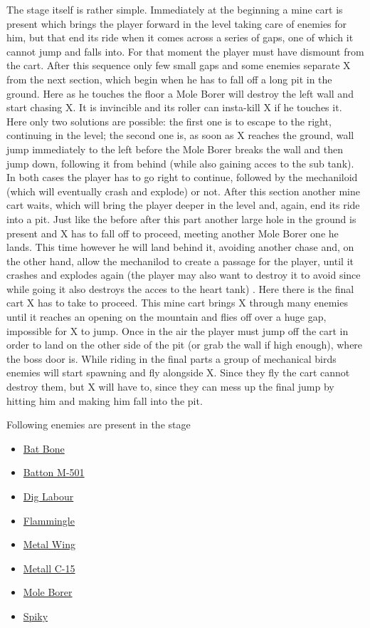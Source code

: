 The stage itself is rather simple. Immediately at the beginning a mine cart is present which brings the player forward in the level taking care of enemies for him, but that end its ride when it comes across a series of gaps, one of which it cannot jump and falls into. For that moment the player must have dismount from the cart. After this sequence only few small gaps and some enemies separate X from the next section, which begin when he has to fall off a long pit in the ground. Here as he touches the floor a Mole Borer will destroy the left wall and start chasing X. It is invincible and its roller can insta-kill X if he touches it. Here only two solutions are possible: the first one is to escape to the right, continuing in the level; the second one is, as soon as X reaches the ground, wall jump immediately to the left before the Mole Borer breaks the wall and then jump down, following it from behind (while also gaining acces to the sub tank). In both cases the player has to go right to continue, followed by the mechaniloid (which will eventually crash and explode) or not. After this section another mine cart waits, which will bring the player deeper in the level and, again, end its ride into a pit. Just like the before after this part another large hole in the ground is present and X has to fall off to proceed, meeting another Mole Borer one he lands. This time however he will land behind it, avoiding another chase and, on the other hand, allow the mechanilod to create a passage for the player, until it crashes and explodes again (the player may also want to destroy it to avoid since while going it also destroys the acces to the heart tank) . Here there is the final cart X has to take to proceed. This mine cart brings X through many enemies until it reaches an opening on the mountain and flies off over a huge gap, impossible for X to jump. Once in the air the player must jump off the cart in order to land on the other side of the pit (or grab the wall if high enough), where the boss door is. While riding in the final parts a group of mechanical birds enemies will start spawning and fly alongside X. Since they fly the cart cannot destroy them, but X will have to, since they can mess up the final jump by hitting him and making him fall into the pit.

Following enemies are present in the stage\cite{wiki:Gallery}
\begin{itemize}
	\item \hyperlink{enem:Bat_Bone}{Bat Bone} 
	\item \hyperlink{enem:Batton_M-501}{Batton M-501} 
	\item \hyperlink{enem:Dig_Labour}{Dig Labour} 
	\item \hyperlink{enem:Flammingle}{Flammingle} 
	\item \hyperlink{enem:Metal_Wing}{Metal Wing} 
	\item \hyperlink{enem:Metall_C-15}{Metall C-15} 
	\item \hyperlink{miniboss:Mole Borer}{Mole Borer}
	\item \hyperlink{enem:Spiky}{Spiky}
\end{itemize}

